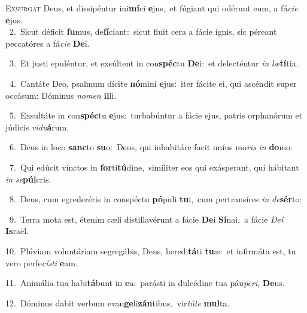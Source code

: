 \lettrine{\initial\textcolor{\initialcolor}{E}}{xsúrgat} Deus, et dissipéntur ini\-\textbf{mí}\-ci \textbf{e}\-jus,~\star et fúgiant qui odérunt eum, a fá\-\textit{ci}\-\textit{e} \textbf{e}\-jus.\\
{\numbfont\textcolor{\numbcolor}{~2.}}~Sicut déficit \textbf{fu}\-mus, de\-\textbf{fí}\-ciant:~\star sicut fluit cera a fácie ignis, sic péreant peccatóres a fá\-\textit{ci}\-\textit{e} \textbf{De}\-i.\par
{\numbfont\textcolor{\numbcolor}{~3.}}~Et justi epuléntur, et exsúltent in con\-\textbf{spéc}\-tu \textbf{De}\-i:~\star et delecténtur \textit{in} \textit{læ}\-\textbf{tí}tia.\par
{\numbfont\textcolor{\numbcolor}{~4.}}~Cantáte Deo, psalmum dícite \textbf{nó}\-mini \textbf{e}\-jus:~\star iter fácite ei, qui ascéndit super occásum: Dóminus \textit{no}\-\textit{men} \textbf{il}\-li.\par
{\numbfont\textcolor{\numbcolor}{~5.}}~Exsultáte in con\-\textbf{spéc}\-tu \textbf{e}\-jus:~\star turbabúntur a fácie ejus, patris orphanórum et júdicis \textit{vi}\-\textit{du}\textbf{á}rum.\par
{\numbfont\textcolor{\numbcolor}{~6.}}~Deus in loco \textbf{sanc}\-to \textbf{su}\-o:~\star Deus, qui inhabitáre facit uníus mo\textit{ris} \textit{in} \textbf{do}\-mo:\par
{\numbfont\textcolor{\numbcolor}{~7.}}~Qui edúcit vinctos in \textbf{for}\-ti\-\textbf{tú}\-dine,~\star simíliter eos qui exásperant, qui hábitant \textit{in} \textit{se}\-\textbf{púl}cris.\par
{\numbfont\textcolor{\numbcolor}{~8.}}~Deus, cum egrederéris in conspéctu \textbf{pó}\-puli \textbf{tu}\-i,~\star cum pertransíres \textit{in} \textit{de}\-\textbf{sér}to:\par
{\numbfont\textcolor{\numbcolor}{~9.}}~Terra mota est, étenim cæli distillavérunt a fácie \textbf{De}\-i \textbf{Sí}\-nai,~\star a fácie \textit{De}\-\textit{i} \textbf{Is}\-raël.\par
{\numbfont\textcolor{\numbcolor}{10.}}~Plúviam voluntáriam segregábis, Deus, heredi\-\textbf{tá}\-ti \textbf{tu}\-æ:~\star et infirmáta est, tu vero perfe\-\textit{cís}\-\textit{ti} \textbf{e}\-am.\par
{\numbfont\textcolor{\numbcolor}{11.}}~Animália tua habi\-\textbf{tá}\-bunt in \textbf{e}\-a:~\star parásti in dulcédine tua páu\-\textit{pe}\-\textit{ri}, \textbf{De}\-us.\par
{\numbfont\textcolor{\numbcolor}{12.}}~Dóminus dabit verbum evan\-\textbf{ge}\-li\-\textbf{zán}\-tibus,~\star vir\-\textit{tú}\-\textit{te} \textbf{mul}\-ta.\par
